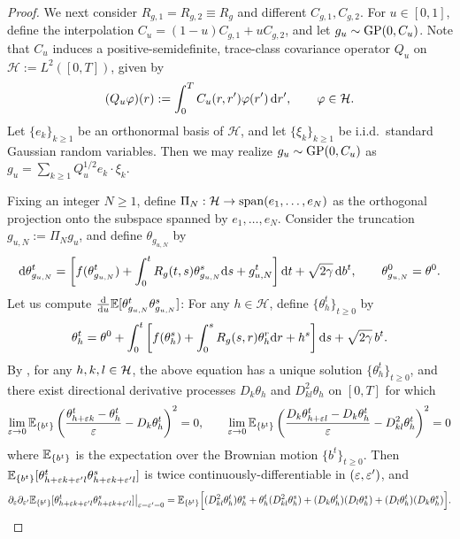 \begin{proof}
We next consider $R_{g,1}=R_{g,2} \equiv R_g$ and different $C_{g,1},C_{g,2}$.
For $u \in [0,1]$, define the interpolation $C_u=(1-u)C_{g,1}+uC_{g,2}$,
and let $g_u \sim \GP(0,C_u)$.
Note that $C_u$ induces a positive-semidefinite, trace-class covariance operator
$Q_u$ on $\mathcal{H}:=L^2([0,T])$, given by
\[
    (Q_u\varphi)(r)
    :=
    \int_0^T C_u(r,r')\varphi(r')\,\d r',
    \qquad
    \varphi\in \mathcal{H}.
\]
Let $\{e_k\}_{k\ge 1}$ be an orthonormal basis of
$\mathcal{H}$, and let $\{\xi_k\}_{k\ge 1}$ be i.i.d.~standard Gaussian random
variables. Then we may realize $g_u \sim \GP(0,C_u)$ as
$g_u=\sum_{k\ge 1}Q_u^{1/2}e_k \cdot \xi_k$.

Fixing an integer $N \geq 1$, define $\Pi_N : {\mathcal H}\to {\sp(e_1,\ldots, e_N)}$ as the orthogonal projection onto the subspace spanned by $e_1,\ldots,e_N$. Consider the truncation
$g_{u,N}:=\Pi_N g_u$, 
and define $\theta_{g_{u,N}}$ by
\[
    \d \theta_{g_{u,N}}^t
    =
        \left[f(\theta_{g_{u,N}}^t)
        +
        \int_0^t R_g(t,s)\theta_{g_{u,N}}^s \d s
        +
        g_{u,N}^t \right]
    \d t + \sqrt{2\gamma}\,\d b^t, \qquad \theta_{g_{u,N}}^0=\theta^0.
\] 
Let us compute
$\frac{\d}{\d u} \E[\theta_{g_{u,N}}^t\theta_{g_{u,N}}^s]$:
For any $h\in \mathcal{H}$, define $\{\theta_h^t\}_{t \geq 0}$ by
\[
    \theta_{h}^t
    =
    \theta^0
    +
    \int_0^t
    \left[
        f(\theta_{h}^s)
        +
        \int_0^s R_g(s,r)\theta_{h}^r \d r
        +
        {h}^s
    \right]
    \d s + \sqrt{2\gamma}\,b^t.
\]
By \cite[Theorem 2.5]{wang2017stochastic}, for any $h,k,l \in \cH$,
the above equation has a unique solution $\{\theta_h^t\}_{t \geq 0}$, and
there exist directional derivative processes
$D_k\theta_h$ and $D_{kl}^2 \theta_h$ on $[0,T]$
for which
\[\lim_{\eps \to 0}
\E_{\{b^t\}}\left(\frac{\theta_{h+\eps k}^t-\theta_h^t}{\eps}
-D_k\theta_h^t\right)^2=0,
\qquad \lim_{\eps \to 0}
\E_{\{b^t\}}\left(\frac{D_k\theta_{h+\eps l}^t-D_k\theta_h^t}{\eps}
-D_{kl}^2\theta_h^t\right)^2=0\]
where $\E_{\{b^t\}}$ is the expectation over the Brownian motion
$\{b^t\}_{t \geq 0}$. Then 
$\E_{\{b^t\}}[\theta_{h+\eps k+\eps'l}^t
\theta_{h+\eps k+\eps'l}^s]$ is twice continuously-differentiable in
$(\eps,\eps')$, and 
\begin{equation}\label{eq:thetatssecondder}
\partial_\eps\partial_{\eps'}
\E_{\{b^t\}}[\theta_{h+\eps k+\eps'l}^t
\theta_{h+\eps k+\eps'l}^s]\big|_{\eps=\eps'=0}
=\E_{\{b^t\}}\Big[(D_{kl}^2\theta_h^t)\theta_h^s
+\theta_h^t (D_{kl}^2\theta_h^s)+(D_k\theta_h^t)(D_l\theta_h^s)
+(D_l\theta_h^t)(D_k\theta_h^s)\Big].
\end{equation}

\end{proof}
